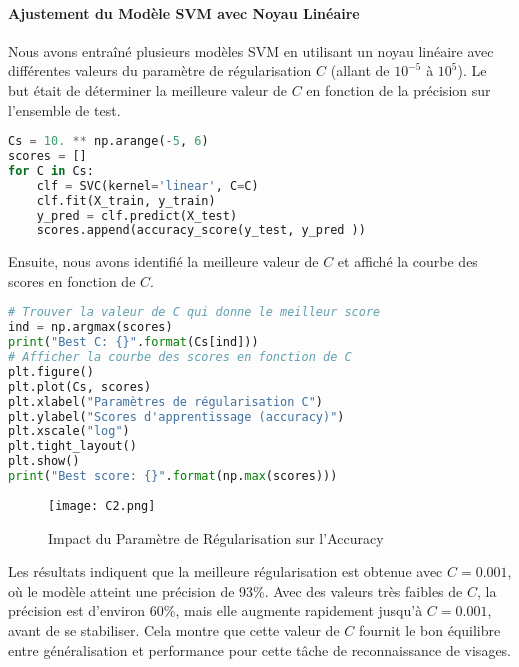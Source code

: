 \documentclass[12pt,a4paper]{report}
\begin{document}
\paragraph{Ajustement du Modèle SVM avec Noyau Linéaire\\}
Nous avons entraîné plusieurs modèles SVM en utilisant un noyau linéaire avec différentes valeurs du paramètre de régularisation \( C \) (allant de \( 10^{-5} \) à \( 10^{5} \)). Le but était de déterminer la meilleure valeur de \( C \) en fonction de la précision sur l'ensemble de test.

\begin{lstlisting}[language=Python, caption=Ajustement du modèle SVM]
Cs = 10. ** np.arange(-5, 6)
scores = []
for C in Cs:
    clf = SVC(kernel='linear', C=C)
    clf.fit(X_train, y_train)
    y_pred = clf.predict(X_test)
    scores.append(accuracy_score(y_test, y_pred ))
\end{lstlisting}

Ensuite, nous avons identifié la meilleure valeur de \( C \) et affiché la courbe des scores en fonction de \( C \).

\begin{lstlisting}[language=Python, caption=Sélection de la meilleure valeur de C]
# Trouver la valeur de C qui donne le meilleur score
ind = np.argmax(scores)
print("Best C: {}".format(Cs[ind]))
# Afficher la courbe des scores en fonction de C
plt.figure()
plt.plot(Cs, scores)
plt.xlabel("Paramètres de régularisation C")
plt.ylabel("Scores d'apprentissage (accuracy)")
plt.xscale("log")
plt.tight_layout()
plt.show()
print("Best score: {}".format(np.max(scores)))
\end{lstlisting}

\begin{figure}[H]
    \centering
    \begin{minipage}{0.9\textwidth}
        \centering
        \texttt{[image: C2.png]}
        \caption{ Impact du Paramètre de Régularisation 
 sur l'Accuracy }
    \end{minipage}
    \end{figure}
Les résultats indiquent que la meilleure régularisation est obtenue avec \(C = 0.001\), où le modèle atteint une précision de 93\%. Avec des valeurs très faibles de \(C\), la précision est d'environ 60\%, mais elle augmente rapidement jusqu'à \(C = 0.001\), avant de se stabiliser. Cela montre que cette valeur de \(C\) fournit le bon équilibre entre généralisation et performance pour cette tâche de reconnaissance de visages.
\end{document}

